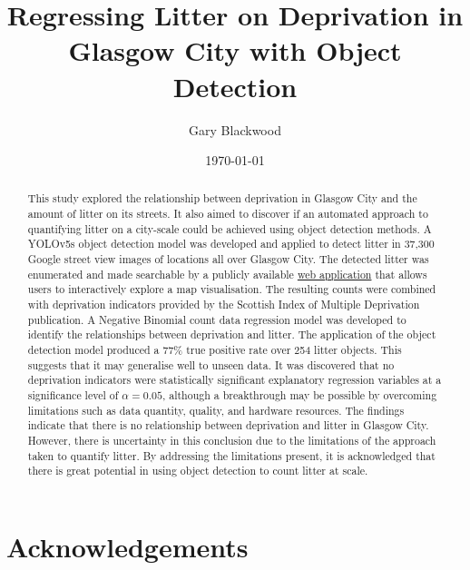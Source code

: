 \documentclass{thesis}
\begin{document}

\title{Regressing Litter on Deprivation in Glasgow City with Object Detection}
\author{Gary Blackwood}
\date{\today}
\maketitle


\begin{abstract}

This study explored the relationship between deprivation in Glasgow City and the amount of litter on its streets. It also aimed to discover if an automated approach to quantifying litter on a city-scale could be achieved using object detection methods. A YOLOv5s object detection model was developed and applied to detect litter in 37,300 Google street view images of locations all over Glasgow City. The detected litter was enumerated and made searchable by a publicly available \href{https://glasgow-litter.garyblackwood.co.uk}{web application} that allows users to interactively explore a map visualisation. The resulting counts were combined with deprivation indicators provided by the Scottish Index of Multiple Deprivation publication. A Negative Binomial count data regression model was developed to identify the relationships between deprivation and litter. The application of the object detection model produced a 77\% true positive rate over 254 litter objects. This suggests that it may generalise well to unseen data. It was discovered that no deprivation indicators were statistically significant explanatory regression variables at a significance level of $\alpha = 0.05$, although a breakthrough may be possible by overcoming limitations such as data quantity, quality, and hardware resources. The findings indicate that there is no relationship between deprivation and litter in Glasgow City. However, there is uncertainty in this conclusion due to the limitations of the approach taken to quantify litter. By addressing the limitations present, it is acknowledged that there is great potential in using object detection to count litter at scale.

\end{abstract}


\chapter*{Acknowledgements}
\end{document}
